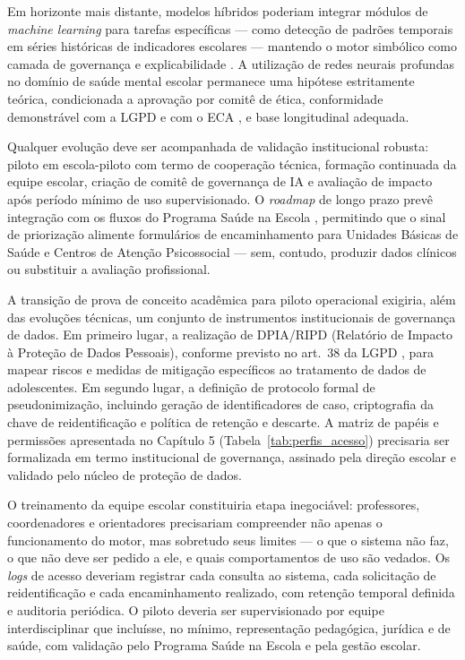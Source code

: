 \documentclass[
    12pt,
    openright,
    oneside,
    a4paper,
    english,
    brazil
]{abntex2}
\begin{document}
Em horizonte mais distante, modelos h\'ibridos poderiam integrar m\'odulos de \textit{machine learning} para tarefas espec\'ificas --- como detec\c{c}\~ao de padr\~oes temporais em s\'eries hist\'oricas de indicadores escolares --- mantendo o motor simb\'olico como camada de governan\c{c}a e explicabilidade \cite{jobin_ai_ethics_2019}. A utiliza\c{c}\~ao de redes neurais profundas no dom\'inio de sa\'ude mental escolar permanece uma hip\'otese estritamente te\'orica, condicionada a aprova\c{c}\~ao por comit\^e de \'etica, conformidade demonstr\'avel com a LGPD \cite{brasil_lgpd_2018} e com o ECA \cite{brasil_eca_1990}, e base longitudinal adequada.

Qualquer evolu\c{c}\~ao deve ser acompanhada de valida\c{c}\~ao institucional robusta: piloto em escola-piloto com termo de coopera\c{c}\~ao t\'ecnica, forma\c{c}\~ao continuada da equipe escolar, cria\c{c}\~ao de comit\^e de governan\c{c}a de IA e avalia\c{c}\~ao de impacto ap\'os per\'iodo m\'inimo de uso supervisionado. O \textit{roadmap} de longo prazo prev\^e integra\c{c}\~ao com os fluxos do Programa Sa\'ude na Escola \cite{brasil_pse_2007}, permitindo que o sinal de prioriza\c{c}\~ao alimente formul\'arios de encaminhamento para Unidades B\'asicas de Sa\'ude e Centros de Aten\c{c}\~ao Psicossocial --- sem, contudo, produzir dados cl\'inicos ou substituir a avalia\c{c}\~ao profissional.

A transi\c{c}\~ao de prova de conceito acad\^emica para piloto operacional exigiria, al\'em das evolu\c{c}\~oes t\'ecnicas, um conjunto de instrumentos institucionais de governan\c{c}a de dados. Em primeiro lugar, a realiza\c{c}\~ao de DPIA/RIPD (Relat\'orio de Impacto \`a Prote\c{c}\~ao de Dados Pessoais), conforme previsto no art.~38 da LGPD \cite{brasil_lgpd_2018}, para mapear riscos e medidas de mitiga\c{c}\~ao espec\'ificos ao tratamento de dados de adolescentes. Em segundo lugar, a defini\c{c}\~ao de protocolo formal de pseudonimiza\c{c}\~ao, incluindo gera\c{c}\~ao de identificadores de caso, criptografia da chave de reidentifica\c{c}\~ao e pol\'itica de reten\c{c}\~ao e descarte. A matriz de pap\'eis e permiss\~oes apresentada no Cap\'itulo 5 (Tabela~\ref{tab:perfis_acesso}) precisaria ser formalizada em termo institucional de governan\c{c}a, assinado pela dire\c{c}\~ao escolar e validado pelo n\'ucleo de prote\c{c}\~ao de dados.

O treinamento da equipe escolar constituiria etapa inegoci\'avel: professores, coordenadores e orientadores precisariam compreender n\~ao apenas o funcionamento do motor, mas sobretudo seus limites --- o que o sistema n\~ao faz, o que n\~ao deve ser pedido a ele, e quais comportamentos de uso s\~ao vedados. Os \textit{logs} de acesso deveriam registrar cada consulta ao sistema, cada solicita\c{c}\~ao de reidentifica\c{c}\~ao e cada encaminhamento realizado, com reten\c{c}\~ao temporal definida e auditoria peri\'odica. O piloto deveria ser supervisionado por equipe interdisciplinar que inclu\'isse, no m\'inimo, representa\c{c}\~ao pedag\'ogica, jur\'idica e de sa\'ude, com valida\c{c}\~ao pelo Programa Sa\'ude na Escola \cite{brasil_pse_2007} e pela gest\~ao escolar.
\end{document}
